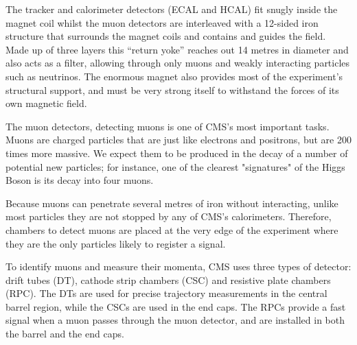 The tracker and calorimeter detectors (ECAL and HCAL) fit snugly inside the magnet coil whilst the muon detectors are interleaved with a 12-sided iron structure that surrounds the magnet coils and contains and guides the field. Made up of three layers this “return yoke” reaches out 14 metres in diameter and also acts as a filter, allowing through only muons and weakly interacting particles such as neutrinos. The enormous magnet also provides most of the experiment’s structural support, and must be very strong itself to withstand the forces of its own magnetic field.

The muon detectors, detecting muons is one of CMS’s most important tasks. Muons are charged particles that are just like electrons and positrons, but are 200 times more massive. We expect them to be produced in the decay of a number of potential new particles; for instance, one of the clearest "signatures" of the Higgs Boson is its decay into four muons.

Because muons can penetrate several metres of iron without interacting, unlike most particles they are not stopped by any of CMS's calorimeters. Therefore, chambers to detect muons are placed at the very edge of the experiment where they are the only particles likely to register a signal.

To identify muons and measure their momenta, CMS uses three types of detector: drift tubes (DT), cathode strip chambers (CSC) and resistive plate chambers (RPC). The DTs are used for precise trajectory measurements in the central barrel region, while the CSCs are used in the end caps. The RPCs provide a fast signal when a muon passes through the muon detector, and are installed in both the barrel and the end caps.
